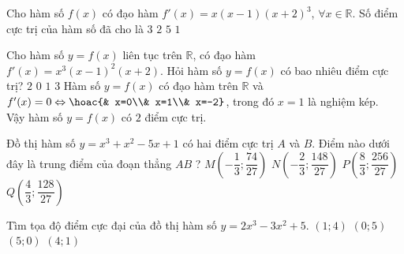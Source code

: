 \begin{ex}%
    Cho hàm số $ f(x) $ có đạo hàm $ f'(x)=x(x-1)(x+2)^3 $, $ \forall x \in \mathbb{R} $. Số điểm cực trị của hàm số đã cho là
    \choice
    {\True $ 3 $}
    {$ 2 $}
    {$ 5 $}
    {$ 1 $}
\end{ex}
\begin{ex}%
    Cho hàm số $y=f(x)$ liên tục trên $\mathbb{R}$, có đạo hàm $f'(x)=x^3\left(x-1\right)^2\left(x+2\right)$. Hỏi hàm số $ y=f(x)$ có bao nhiêu điểm cực trị?
    \choice
    {\True $ 2$}
    {$ 0$}
    {$ 1$}
    {$ 3$}
    \loigiai
    {
        Hàm số $y=f(x)$ có đạo hàm trên $\mathbb{R}$ và $f'(x)=0\Leftrightarrow\hoac{&
            x=0\\&
            x=1\\&
            x=-2}$, trong đó $x=1$ là nghiệm kép.\\
        Vậy hàm số $y=f(x)$ có $2$ điểm cực trị.
    }
\end{ex}
\begin{ex}%
    Đồ thị hàm số $y=x^3+x^2-5x+1$ có hai điểm cực trị $A$ và $B$. Điểm nào dưới đây là trung điểm của đoạn thẳng $AB$ ?
    \choice
    {\True $M\left( -\dfrac{1}{3};\dfrac{74}{27}\right)$}
    {$N\left( -\dfrac{2}{3};\dfrac{148}{27}\right)$}
    {$P\left( \dfrac{8}{3};\dfrac{256}{27}\right)$}
    {$Q\left( \dfrac{4}{3};\dfrac{128}{27}\right)$}
\end{ex}
\begin{ex}%
    Tìm tọa độ điểm cực đại của đồ thị hàm số $y=2x^3-3x^2+5$.
    \choice
    {$(1; 4)$}
    {\True $(0; 5)$}
    {$(5; 0)$}
    {$(4; 1)$}
\end{ex}
